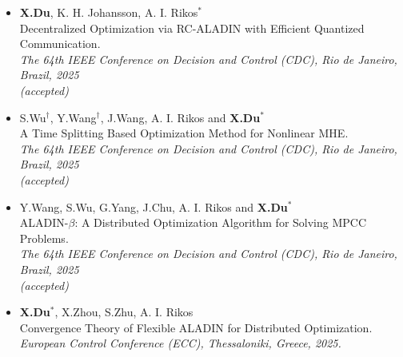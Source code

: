 \documentclass[paper=a4,fontsize=11pt]{scrartcl} %
\newcommand{\EducationEntry}[4]{
		\noindent \textbf{#1} \hfill      %
		\colorbox{White}{%
			\parbox{5cm}{%
			\hfill\color{Black}#2}} \par  %
		\noindent \textit{#3} \par        %
		\noindent\hangindent=2em\hangafter=0 \small #4 %
		\normalsize \par}
\begin{document}
\begin{itemize}
		\item  {\textbf{X.Du}, K. H. Johansson,  A. I. Rikos$^*$ \\
		{Decentralized Optimization via RC-ALADIN with Efficient Quantized Communication.}\\
		\emph{The 64th IEEE Conference on Decision and Control (CDC), Rio de Janeiro, Brazil, 2025\\(accepted)
	} }

	\item  {S.Wu$^\dagger$, Y.Wang$^\dagger$, J.Wang, A. I. Rikos and \textbf{X.Du}$^*$ \\
	{A Time Splitting Based Optimization Method for Nonlinear MHE.}\\
	\emph{The 64th IEEE Conference on Decision and Control (CDC), Rio de Janeiro, Brazil, 2025\\(accepted)
} }

	\item  {Y.Wang, S.Wu, G.Yang, J.Chu, A. I. Rikos and \textbf{X.Du}$^*$ \\
	{ALADIN-$\beta$: A Distributed Optimization Algorithm for Solving MPCC Problems.}\\
	\emph{The 64th IEEE Conference on Decision and Control (CDC), Rio de Janeiro, Brazil, 2025\\(accepted)
} }

		
	\item  {\textbf{X.Du}$^*$, X.Zhou, S.Zhu, A. I. Rikos \\
		{ Convergence Theory of Flexible ALADIN for Distributed Optimization.}\\
		\emph{European Control Conference (ECC), Thessaloniki, Greece, 2025.
	} }
	

\end{itemize}
\end{document}

